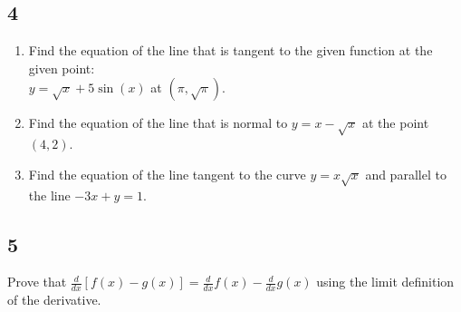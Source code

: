 \documentclass[letterpaper,12pt]{article}
\begin{document}
\subsection*{4}
    	\begin{enumerate}[label=\alph*)]
		    \item Find the equation of the line that is tangent to the given function at the given point:\\
		    $y=\sqrt{x}+5\sin(x)$ at $\left(\pi,\sqrt{\pi}\right)$.
		
			\item Find the equation of the line that is normal to $y=x-\sqrt{x}$ at the point $(4,2)$.
			
			\item Find the equation of the line tangent to the curve $y = x\sqrt{x}$ and parallel to the line $-3x + y = 1$.
		\end{enumerate}

\subsection*{5}
Prove that $\frac{d}{dx}[f(x)-g(x)]=\frac{d}{dx}f(x)-\frac{d}{dx}g(x)$ using the limit definition of the derivative.
\end{document}
